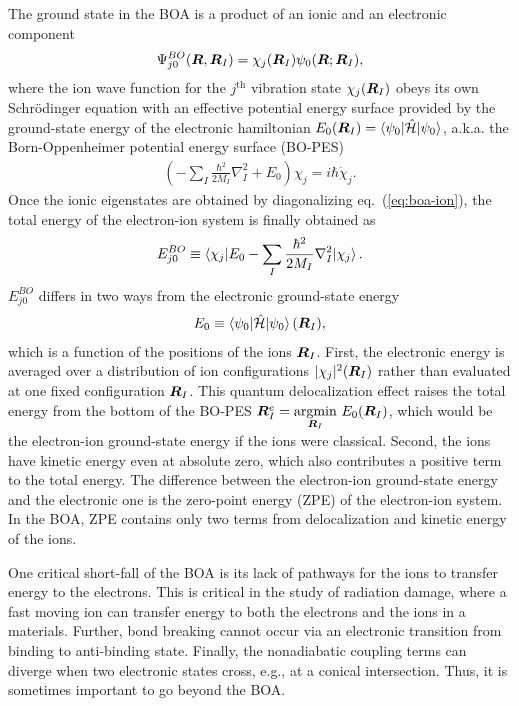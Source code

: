 The ground state in the BOA is a product of an ionic and an electronic component
\begin{align}
\Psi_{j 0}^{BO}(\boldsymbol{R},\boldsymbol{R}_I) = \chi_j(\boldsymbol{R}_I) \psi_0(\boldsymbol{R};\boldsymbol{R}_I),
\end{align}
where the ion wave function for the $j^{\text{th}}$ vibration state $\chi_j(\boldsymbol{R}_I)$ obeys its own Schr\"odinger equation with an effective potential energy surface provided by the ground-state energy of the electronic hamiltonian $E_0(\boldsymbol{R}_I) = \braket{\psi_0|\hat{\mathcal{H}}|\psi_0}$, a.k.a. the Born-Oppenheimer potential energy surface (BO-PES)
\begin{align} \label{eq:boa-ion}
\left(-\sum_I\frac{\hbar^2}{2M_I}\nabla^2_I+E_0\right)\chi_j = i\hbar\dot{\chi}_j.
\end{align}
Once the ionic eigenstates are obtained by diagonalizing eq.~(\ref{eq:boa-ion}), the total energy of the electron-ion system is finally obtained as
\begin{align}
E_{j0}^{BO} \equiv \braket{\chi_j| E_0 -\sum_I\frac{\hbar^2}{2M_I}\nabla^2_I |\chi_j}.
\end{align}
$E_{j0}^{BO}$ differs in two ways from the electronic ground-state energy
\begin{align}
E_0 \equiv \braket{\psi_0|\hat{\mathcal{H}}|\psi_0}(\boldsymbol{R}_I),
\end{align}
which is a function of the positions of the ions $\boldsymbol{R}_I$. First, the electronic energy is averaged over a distribution of ion configurations $\vert\chi_j\vert^2(\boldsymbol{R}_I)$ rather than evaluated at one fixed configuration $\boldsymbol{R}_I$. This quantum delocalization effect raises the total energy from the bottom of the BO-PES $\boldsymbol{R}_I^e=\underset{\boldsymbol{R}_I}{\text{argmin}}~E_0(\boldsymbol{R}_I)$, which would be the electron-ion ground-state energy if the ions were classical. Second, the ions have kinetic energy even at absolute zero, which also contributes a positive term to the total energy.
The difference between the electron-ion ground-state energy and the electronic one is the zero-point energy (ZPE) of the electron-ion system. In the BOA, ZPE contains only two terms from delocalization and kinetic energy of the ions.

One critical short-fall of the BOA is its lack of pathways for the ions to transfer energy to the electrons. This is critical in the study of radiation damage, where a fast moving ion can transfer energy to both the electrons and the ions in a materials. Further, bond breaking cannot occur via an electronic transition from binding to anti-binding state. Finally, the nonadiabatic coupling terms can diverge when two electronic states cross, e.g., at a conical intersection. Thus, it is sometimes important to go beyond the BOA.

